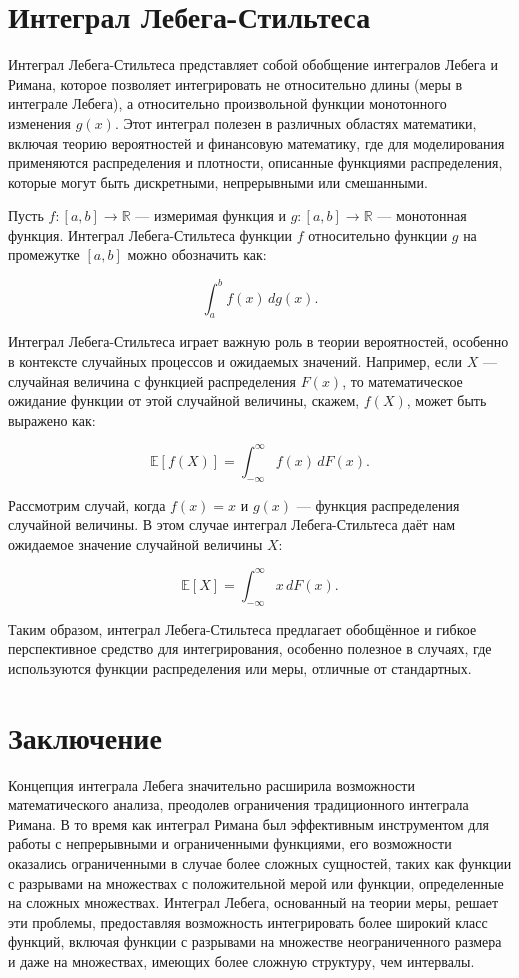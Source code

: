 \documentclass[a4paper,14pt]{extarticle}
\begin{document}
\newpage
\section{Интеграл Лебега-Стильтеса}

Интеграл Лебега-Стильтеса представляет собой обобщение интегралов Лебега и Римана, которое позволяет интегрировать не относительно длины (меры в интеграле Лебега), а относительно произвольной функции монотонного изменения $g(x)$. Этот интеграл полезен в различных областях математики, включая теорию вероятностей и финансовую математику, где для моделирования применяются распределения и плотности, описанные функциями распределения, которые могут быть дискретными, непрерывными или смешанными.

Пусть $f : [a, b] \to \mathbb{R}$ — измеримая функция и $g : [a, b] \to \mathbb{R}$ — монотонная функция. Интеграл Лебега-Стильтеса функции $f$ относительно функции $g$ на промежутке \([a, b]\) можно обозначить как:

$$
\int_a^b f(x) \, dg(x).
$$

Интеграл Лебега-Стильтеса играет важную роль в теории вероятностей, особенно в контексте случайных процессов и ожидаемых значений. Например, если $X$ — случайная величина с функцией распределения $F(x)$, то математическое ожидание функции от этой случайной величины, скажем, $f(X)$, может быть выражено как:

$$
\mathbb{E}[f(X)] = \int_{-\infty}^{\infty} f(x) \, dF(x).
$$

Рассмотрим случай, когда $f(x) = x$ и $g(x)$ — функция распределения случайной величины. В этом случае интеграл Лебега-Стильтеса даёт нам ожидаемое значение случайной величины $X$:

$$
\mathbb{E}[X] = \int_{-\infty}^{\infty} x \, dF(x).
$$

Таким образом, интеграл Лебега-Стильтеса предлагает обобщённое и гибкое перспективное средство для интегрирования, особенно полезное в случаях, где используются функции распределения или меры, отличные от стандартных. ~\cite{wikipedia_lebesgue_stieltjes}

\newpage
\section*{Заключение}

Концепция интеграла Лебега значительно расширила возможности математического анализа, преодолев ограничения традиционного интеграла Римана. В то время как интеграл Римана был эффективным инструментом для работы с непрерывными и ограниченными функциями, его возможности оказались ограниченными в случае более сложных сущностей, таких как функции с разрывами на множествах с положительной мерой или функции, определенные на сложных множествах. Интеграл Лебега, основанный на теории меры, решает эти проблемы, предоставляя возможность интегрировать более широкий класс функций, включая функции с разрывами на множестве неограниченного размера и даже на множествах, имеющих более сложную структуру, чем интервалы.
\end{document}
